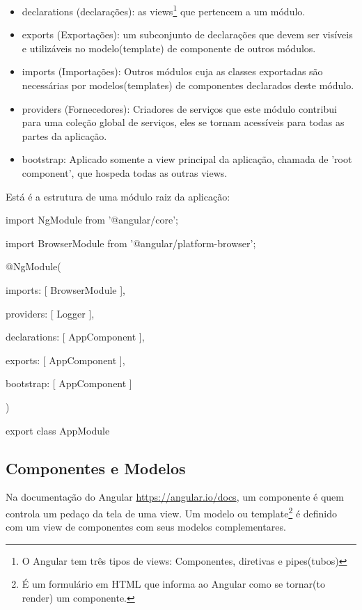 \begin{itemize}

\item declarations (declarações): as views\footnote{O Angular tem três tipos de views: Componentes, diretivas e pipes(tubos)} que pertencem a um módulo.

\item exports (Exportações): um subconjunto de declarações que devem ser visíveis e utilizáveis no modelo(template) de componente de outros módulos.

\item imports (Importações): Outros módulos cuja as classes exportadas são necessárias por modelos(templates) de componentes declarados deste módulo.

\item providers (Fornecedores): Criadores de serviços que este módulo contribui para uma coleção global de serviços, eles se tornam acessíveis para todas as partes da aplicação.

\item bootstrap: Aplicado somente a view principal da aplicação, chamada de 'root component', que hospeda todas as outras views.   
\end{itemize}

Está é a estrutura de uma módulo raiz da aplicação:

import { NgModule }      from '@angular/core';

import { BrowserModule } from '@angular/platform-browser';

@NgModule({

  imports:      [ BrowserModule ],
  
  providers:    [ Logger ],
  
  declarations: [ AppComponent ],
  
  exports:      [ AppComponent ],
  
  bootstrap:    [ AppComponent ]
  
})

export class AppModule { }

\subsection{Componentes e Modelos}
Na documentação do Angular \url{https://angular.io/docs}, um componente é quem controla um pedaço da tela de uma view. Um modelo ou template\footnote{É um formulário em HTML que informa ao Angular como se tornar(to render) um componente.} é definido com um view de componentes com seus modelos complementares.


